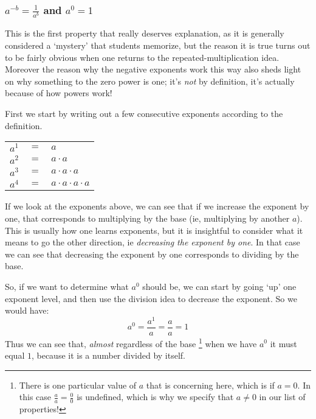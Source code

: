 \documentclass{ximeraXloud}
\begin{document}
    \subsubsection*{$a^{-b} = \frac{1}{a^b}$ and $a^0 = 1$}
        This is the first property that really deserves explanation, as it is generally considered a `mystery' that students memorize, but the reason it is true turns out to be fairly obvious when one returns to the repeated-multiplication idea. Moreover the reason why the negative exponents work this way also sheds light on why something to the zero power is one; it's \textit{not} by definition, it's actually because of how powers work!
        
        
        First we start by writing out a few consecutive exponents according to the definition.
        
        \begin{center}
            \begin{tabular}{ccl}
                $a^1$ & $ = $ & $a$ \\
                $a^2$ & $ = $ & $a \cdot a$ \\
                $a^3$ & $ = $ & $a \cdot a \cdot a$ \\
                $a^4$ & $ = $ & $a \cdot a \cdot a \cdot a$ \\
            \end{tabular}
        \end{center}
        
        If we look at the exponents above, we can see that if we increase the exponent by one, that corresponds to multiplying by the base (ie, multiplying by another $a$). This is usually how one learns exponents, but it is insightful to consider what it means to go the other direction, ie \textit{decreasing the exponent by one}. In that case we can see that decreasing the exponent by one corresponds to dividing by the base.
        
        So, if we want to determine what $a^0$ should be, we can start by going `up' one exponent level, and then use the division idea to decrease the exponent. So we would have:
        \[
            a^0 = \frac{a^1}{a} = \frac{a}{a} = 1
        \]
        Thus we can see that, \textit{almost} regardless of the base%
        \footnote{%
            There is one particular value of $a$ that is concerning here, which is if $a = 0$. In this case $\frac{a}{a} = \frac{0}{0}$ is undefined, which is why we specify that $a \neq 0$ in our list of properties!
            }
        when we have $a^0$ it must equal $1$, because it is a number divided by itself.
        
\end{document}
